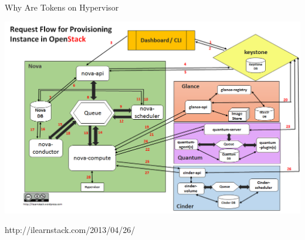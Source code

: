 \documentclass{beamer}
\begin{document}
\begin{frame}{Why Are Tokens on Hypervisor}
  \begin{block}{}
    \includegraphics[scale=0.3]{request-flow1.png}
  \end{block}
  http://ilearnstack.com/2013/04/26/
\end {frame}
\end{document}
